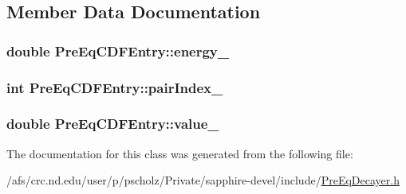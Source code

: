 \subsection{Member Data Documentation}
\hypertarget{classPreEqCDFEntry_a59bcfcf73dfbcc3af62cdbd85b3299dc}{
\subsubsection[{energy\-\_\-}]{\setlength{\rightskip}{0pt plus 5cm}double Pre\-Eq\-C\-D\-F\-Entry\-::energy\-\_\-}}\label{classPreEqCDFEntry_a59bcfcf73dfbcc3af62cdbd85b3299dc}
\hypertarget{classPreEqCDFEntry_a26ae0cab9ef4a3cea18e5fcdd9a95219}{
\subsubsection[{pair\-Index\-\_\-}]{\setlength{\rightskip}{0pt plus 5cm}int Pre\-Eq\-C\-D\-F\-Entry\-::pair\-Index\-\_\-}}\label{classPreEqCDFEntry_a26ae0cab9ef4a3cea18e5fcdd9a95219}
\hypertarget{classPreEqCDFEntry_ab45f5e96c71a4f89a19bd9f0b4160fb8}{
\subsubsection[{value\-\_\-}]{\setlength{\rightskip}{0pt plus 5cm}double Pre\-Eq\-C\-D\-F\-Entry\-::value\-\_\-}}\label{classPreEqCDFEntry_ab45f5e96c71a4f89a19bd9f0b4160fb8}


The documentation for this class was generated from the following file\-:\begin{DoxyCompactItemize}
\item 
/afs/crc.\-nd.\-edu/user/p/pscholz/\-Private/sapphire-\/devel/include/\hyperlink{PreEqDecayer_8h}{Pre\-Eq\-Decayer.\-h}\end{DoxyCompactItemize}

